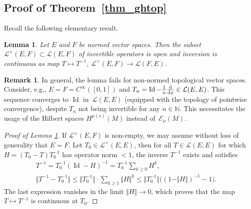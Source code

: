 \documentclass[pdftex]{sigma}
\numberwithin{equation}{section}
\newtheorem{Lemma}[Theorem]{Lemma}
\theoremstyle{definition}
\newtheorem{Remark}[Theorem]{Remark}
\newcommand{\1}{{\bf 1}}
\begin{document}
\subsection{Proof of Theorem~\ref{thm_ghtop}}
 Recall the following elementary result.

\begin{Lemma}\label{inversion} Let $E$ and $F$ be normed vector spaces. Then the subset $\mathcal L^\times(E,F) \subset \mathcal L(E,F)$ of invertible operators is open and inversion is continuous as map
$
T\mapsto T^{-1}$, $ \mathcal L^\times(E,F)\rightarrow \mathcal L(F,E)$.
\end{Lemma}

\begin{Remark}
In general, the lemma fails for non-normed topological vector spaces. Consider, e.g., $E=F=C^\infty([0,1])$ and $T_n = \operatorname{Id} - \frac 1n \frac {\rm d}{{\rm d}x}\in \mathcal L(E,E)$. This sequence converges to $\operatorname{Id}$ in~$\mathcal L(E,E)$ (equipped with the topology of pointwise convergence), despite $T_n$ not being invertible for any $n\in \mathbb N$. This necessitates the usage of the Hilbert spaces $H^{\mu(s)}(M)$ instead of~$\mathcal E_\mu(M)$.
\end{Remark}

\begin{proof}[Proof of Lemma \ref{inversion}] If $\mathcal L^\times (E,F)$ is non-empty, we may assume without loss of generality that $E=F$. Let $T_0\in \mathcal L^\times (E,E)$, then for all $T\in \mathcal L(E,E)$ for which $H= (T_0-T)T_0^{-1}$ has operator norm $<1$, the inverse $T^{-1}$ exists and satisfies
\begin{gather*}
T^{-1} =T_0^{-1}(\operatorname{Id} - H )^{-1} = T_0^{-1} \sum_{k\ge 0} H^k,\\
\big\Vert T^{-1} -T_0^{-1} \big\Vert \le \bigl\Vert T_0^{-1} \bigr\Vert \cdot \sum_{k\ge 1}  \Vert H \Vert^k \le \big\Vert T_0^{-1} \big\Vert \bigl((1-\Vert H \Vert)^{-1} - 1\bigr).
\end{gather*}
The last expression vanishes in the limit $\Vert H \Vert\rightarrow 0$, which proves that the map $T\mapsto T^{-1}$ is continuous at $T_0$.
\end{proof}
\end{document}
